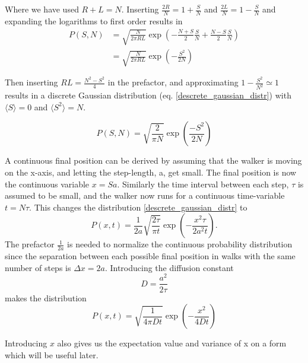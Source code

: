 Where we have used $R+L=N$. 
Inserting $\frac{2R}{N}=1+\frac{S}{N}$ and $\frac{2L}{N}=1-\frac{S}{N}$ and expanding the logarithms to first order results in
\begin{align*}
 P(S,N) &= \sqrt{\frac{N}{2\pi RL}}\exp\left(-\frac{N+S}{2}\frac{S}{N} + \frac{N-S}{2}\frac{S}{N}\right)\\
 &= \sqrt{\frac{N}{2\pi RL}}\exp\left(-\frac{S^2}{2N}\right)
\end{align*}

Then inserting $RL=\frac{N^2-S^2}{4}$ in the prefactor, and approximating $1-\frac{S^2}{N^2}\simeq1$ results in a discrete Gaussian distribution (eq. \ref{descrete_gaussian_distr}) with $\langle S\rangle = 0$  and $\langle S^2\rangle = N$.

\begin{equation}\label{descrete_gaussian_distr}
 P(S,N) =\sqrt{\frac{2}{\pi N}}\exp\left(\frac{-S^2}{2N}\right)
\end{equation}

A continuous final position can be derived by assuming that the walker is moving on the x-axis, and letting the step-length, a, get small. 
The final position is now the continuous variable $x=Sa$.
Similarly the time interval between each step, $\tau$ is assumed to be small, and the walker now runs for a continuous time-variable $t=N\tau$.
This changes the distribution \ref{descrete_gaussian_distr} to
\begin{equation}
 P(x,t) = \frac{1}{2a}\sqrt{\frac{2\tau}{\pi t}}\exp\left(-\frac{x^2\tau}{2a^2t}\right). 
\end{equation}
The prefactor $\frac{1}{2a}$ is needed to normalize the continuous probability distribution since the separation between each possible final position in walks with the same number of steps is $\Delta x=2a$. 
Introducing the diffusion constant
\begin{equation}
D = \frac{a^2}{2\tau} 
\end{equation}
makes the distribution
\begin{equation}
 P(x,t) = \sqrt{\frac{1}{4\pi Dt}}\exp\left(-\frac{x^2}{4Dt}\right)
\end{equation}

Introducing $x$ also gives us the expectation value and variance of x on a form which will be useful later. 

